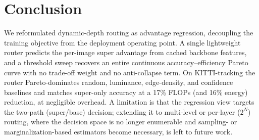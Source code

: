 \section{Conclusion}
\label{sec:conclusion}

We reformulated dynamic-depth routing as advantage regression, decoupling the
training objective from the deployment operating point. A single lightweight router
predicts the per-image super advantage from cached backbone features, and a
threshold sweep recovers an entire continuous accuracy--efficiency Pareto curve with
no trade-off weight and no anti-collapse term. On KITTI-tracking the router
Pareto-dominates random, luminance, edge-density, and confidence baselines and
matches super-only accuracy at a 17\% FLOPs (and 16\% energy) reduction, at
negligible overhead. A limitation is that the regression view targets the two-path
(super/base) decision; extending it to multi-level or per-layer ($2^N$) routing,
where the decision space is no longer enumerable and sampling- or
marginalization-based estimators become necessary, is left to future work.

